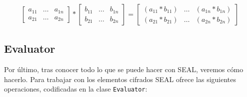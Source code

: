 \begin{gather}
    \begin{bmatrix}
        a_{11}  & \hdots    & a_{1n} \\
        a_{21}  & \hdots    & a_{2n}
    \end{bmatrix}
    *
    \begin{bmatrix}
        b_{11}  & \hdots    & b_{1n} \\
        b_{21}  & \hdots    & b_{2n}
    \end{bmatrix} 
    =
    \begin{bmatrix}
        (a_{11} * b_{11})    & \hdots    & (a_{1n} * b_{1n}) \\
        (a_{21} * b_{21})    & \hdots    & (a_{2n} * b_{2n})
    \end{bmatrix}
\end{gather}



\subsection{Evaluator}

Por último, tras conocer todo lo que se puede hacer con SEAL, veremos cómo hacerlo. Para trabajar con los elementos cifrados SEAL ofrece las siguientes operaciones, codificadas en la clase \verb|Evaluator|:

